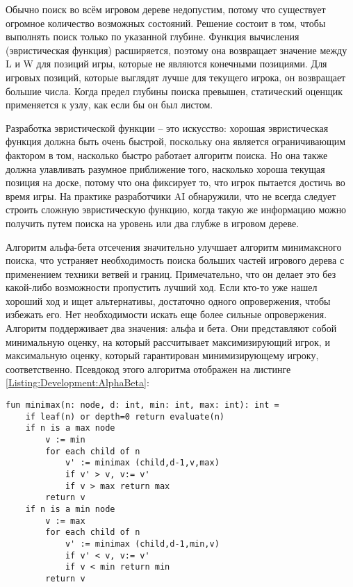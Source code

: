 Обычно поиск во всём игровом дереве недопустим, потому что существует огромное количество возможных состояний. Решение состоит в том, чтобы выполнять поиск только по указанной глубине. Функция вычисления (эвристическая функция) расширяется, поэтому она возвращает значение между L и W для позиций игры, которые не являются конечными позициями. Для игровых позиций, которые выглядят лучше для текущего игрока, он возвращает большие числа. Когда предел глубины поиска превышен, статический оценщик применяется к узлу, как если бы он был листом.

Разработка эвристической функции -- это искусство: хорошая эвристическая функция должна быть очень быстрой, поскольку она является ограничивающим фактором в том, насколько быстро работает алгоритм поиска. Но она также должна улавливать разумное приближение того, насколько хороша текущая позиция на доске, потому что она фиксирует то, что игрок пытается достичь во время игры. На практике разработчики AI обнаружили, что не всегда следует строить сложную эвристическую функцию, когда такую же информацию можно получить путем поиска на уровень или два глубже в игровом дереве.

Алгоритм альфа-бета отсечения значительно улучшает алгоритм минимаксного поиска, что устраняет необходимость поиска больших частей игрового дерева с применением техники ветвей и границ. Примечательно, что он делает это без какой-либо возможности пропустить лучший ход. Если кто-то уже нашел хороший ход и ищет альтернативы, достаточно одного опровержения, чтобы избежать его. Нет необходимости искать еще более сильные опровержения. Алгоритм поддерживает два значения: альфа и бета. Они представляют собой минимальную оценку, на который рассчитывает максимизирующий игрок, и максимальную оценку, который гарантирован минимизирующему игроку, соответственно. Псевдокод этого алгоритма отображен на листинге \ref{Listing:Development:AlphaBeta}:

\begin{lstlisting}[caption={Псевдокод алгоритма альфа-бета отсечения}, label=Listing:Development:AlphaBeta]
fun minimax(n: node, d: int, min: int, max: int): int =
    if leaf(n) or depth=0 return evaluate(n)
    if n is a max node
        v := min
        for each child of n
            v' := minimax (child,d-1,v,max)
            if v' > v, v:= v'
            if v > max return max
        return v
    if n is a min node
        v := max
        for each child of n
            v' := minimax (child,d-1,min,v)
            if v' < v, v:= v'
            if v < min return min
        return v
\end{lstlisting}

